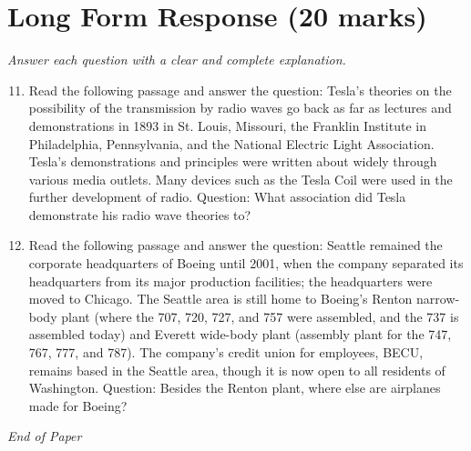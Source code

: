 \documentclass[12pt]{article}
\begin{document}
\section*{Long Form Response (20 marks)}
\textit{Answer each question with a clear and complete explanation.}
\begin{enumerate}[label=\arabic*.]
\setcounter{enumi}{10}
\item Read the following passage and answer the question: Tesla's theories on the possibility of the transmission by radio waves go back as far as lectures and demonstrations in 1893 in St. Louis, Missouri, the Franklin Institute in Philadelphia, Pennsylvania, and the National Electric Light Association. Tesla's demonstrations and principles were written about widely through various media outlets. Many devices such as the Tesla Coil were used in the further development of radio. Question: What association did Tesla demonstrate his radio wave theories to?
\item Read the following passage and answer the question: Seattle remained the corporate headquarters of Boeing until 2001, when the company separated its headquarters from its major production facilities; the headquarters were moved to Chicago. The Seattle area is still home to Boeing's Renton narrow-body plant (where the 707, 720, 727, and 757 were assembled, and the 737 is assembled today) and Everett wide-body plant (assembly plant for the 747, 767, 777, and 787). The company's credit union for employees, BECU, remains based in the Seattle area, though it is now open to all residents of Washington. Question: Besides the Renton plant, where else are airplanes made for Boeing?
\end{enumerate}

\vfill
\noindent\textit{End of Paper}
\end{document}
